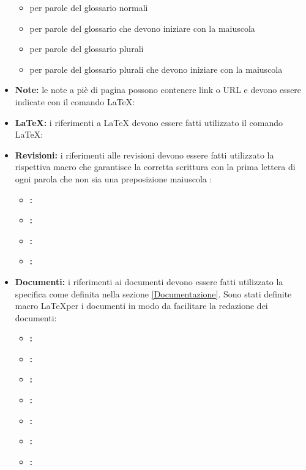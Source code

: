 \documentclass[12pt,a4paper]{article}
\begin{document}
\begin{itemize}
	\begin{itemize}
		\item {} per parole del glossario normali
		\item {} per parole del glossario che devono iniziare con la maiuscola
		\item {} per parole del glossario plurali
		\item {} per parole del glossario plurali che devono iniziare con la maiuscola
	\end{itemize}
	\item \textbf{Note:} le note a piè di pagina possono contenere link o URL e devono essere indicate con il comando \LaTeX: 
	\item \textbf{\LaTeX:} i riferimenti a \LaTeX{} devono essere fatti utilizzato il comando \LaTeX: 
	\item \textbf{Revisioni:} i riferimenti alle revisioni devono essere fatti utilizzato la rispettiva macro che garantisce la corretta scrittura con la prima lettera di ogni parola che non sia una preposizione maiuscola :
	\begin{itemize}
		\item \textbf{\RR:} 
		\item \textbf{\RP:} 
		\item \textbf{\RQ:} 
		\item \textbf{\RA:} 
	\end{itemize}
	\item \textbf{Documenti:} i riferimenti ai documenti devono essere fatti utilizzato la specifica come definita nella sezione \ref{Documentazione}. Sono stati definite macro  \LaTeX per i documenti in modo da facilitare la redazione dei documenti:
	\begin{itemize}
		\item \textbf{\NdP:} 
		\item \textbf{\SdF:} 
		\item \textbf{\AdR:} 
		\item \textbf{\PdP:} 
		\item \textbf{\PdQ:} 
		\item \textbf{\DP:} 
		\item \textbf{\ST:} 

\end{itemize}
\end{itemize}
\end{document}
